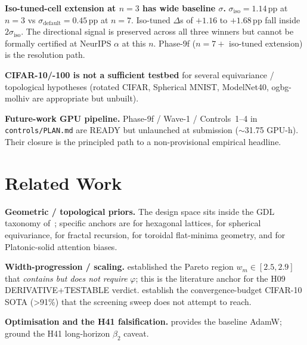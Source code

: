 \documentclass{article}
\begin{document}
\textbf{Iso-tuned-cell extension at $n{=}3$ has wide baseline
$\sigma$.} $\sigma_{\mathrm{iso}}{=}1.14$\,pp at $n{=}3$ vs
$\sigma_{\mathrm{default}}{=}0.45$\,pp at $n{=}7$. Iso-tuned
$\Delta$s of $+1.16$ to $+1.68$\,pp fall inside
$2\sigma_{\mathrm{iso}}$. The directional signal is preserved across
all three winners but cannot be formally certified at NeurIPS
$\alpha$ at this $n$. Phase-9f ($n{=}7+$ iso-tuned extension) is the
resolution path.

\textbf{CIFAR-10/-100 is not a sufficient testbed} for several
equivariance / topological hypotheses (rotated CIFAR, Spherical MNIST,
ModelNet40, ogbg-molhiv are appropriate but unbuilt).

\textbf{Future-work GPU pipeline.} Phase-9f / Wave-1 / Controls~1--4
in \texttt{controls/PLAN.md} are READY but unlaunched at submission
($\sim$31.75 GPU-h). Their closure is the principled path to a
non-provisional empirical headline.

\section{Related Work}
\label{sec:related}

\textbf{Geometric / topological priors.} The design space sits inside
the GDL taxonomy of~\citet{bronstein2021gdl}; specific anchors are
\citet{hoogeboom2018hexaconv} for hexagonal lattices,
\citet{cohen2019spherical} for spherical equivariance,
\citet{larsson2017fractalnet} for fractal recursion,
\citet{pittorino2022toroidal} for toroidal flat-minima geometry, and
\citet{islam2025platonic} for Platonic-solid attention biases.

\textbf{Width-progression / scaling.} \citet{radosavovic2020regnet}
established the Pareto region $w_m \in [2.5, 2.9]$ that
\emph{contains but does not require} $\varphi$; this is the literature
anchor for the H09 DERIVATIVE+TESTABLE verdict.
\citet{he2016resnet, huang2017densenet, liu2022convnext, bello2021resnetrs,
wightman2021rsb, hetricks2019} establish the convergence-budget
CIFAR-10 SOTA (\textgreater 91\%) that the screening sweep does not
attempt to reach.

\textbf{Optimisation and the H41 falsification.}
\citet{loshchilov2019adamw} provides the baseline AdamW;
\citet{reddi2018adam, choi2019optimizer, wilson2017marginal,
hoffer2017longer} ground the H41 long-horizon $\beta_2$ caveat.
\end{document}
